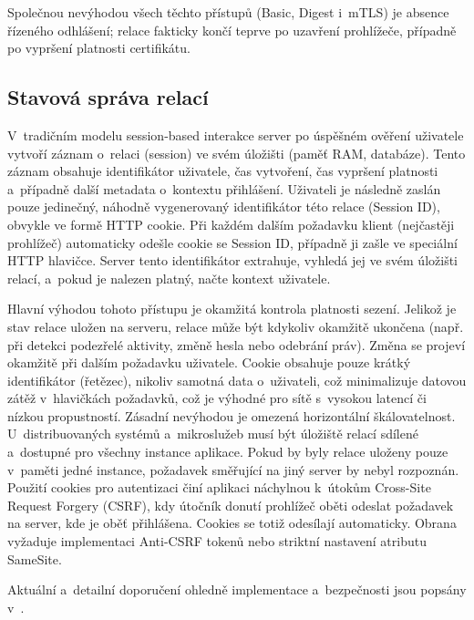 Společnou nevýhodou všech těchto přístupů (Basic, Digest i~mTLS) je absence řízeného odhlášení; relace fakticky končí teprve po uzavření prohlížeče, případně po vypršení platnosti certifikátu.


\subsection{Stavová správa relací}
V~tradičním modelu session-based interakce server po úspěšném ověření uživatele vytvoří záznam o~relaci (session) ve svém úložišti (paměť RAM, databáze).
Tento záznam obsahuje identifikátor uživatele, čas vytvoření, čas vypršení platnosti a~případně další metadata o~kontextu přihlášení.
Uživateli je následně zaslán pouze jedinečný, náhodně vygenerovaný identifikátor této relace (Session ID), obvykle ve formě HTTP cookie.
Při každém dalším požadavku klient (nejčastěji prohlížeč) automaticky odešle cookie se Session ID, případně ji zašle ve speciální HTTP hlavičce.
Server tento identifikátor extrahuje, vyhledá jej ve svém úložišti relací, a~pokud je nalezen platný, načte kontext uživatele.

Hlavní výhodou tohoto přístupu je okamžitá kontrola platnosti sezení.
Jelikož je stav relace uložen na serveru, relace může být kdykoliv okamžitě ukončena (např. při detekci podezřelé aktivity, změně hesla nebo odebrání práv).
Změna se projeví okamžitě při dalším požadavku uživatele.
Cookie obsahuje pouze krátký identifikátor (řetězec), nikoliv samotná data o~uživateli, což minimalizuje datovou zátěž v~hlavičkách požadavků, což je výhodné pro sítě s~vysokou latencí či nízkou propustností.
Zásadní nevýhodou je omezená horizontální škálovatelnost.
U~distribuovaných systémů a~mikroslužeb musí být úložiště relací sdílené a~dostupné pro všechny instance aplikace.
Pokud by byly relace uloženy pouze v~paměti jedné instance, požadavek směřující na jiný server by nebyl rozpoznán.
Použití cookies pro autentizaci činí aplikaci náchylnou k~útokům Cross-Site Request Forgery (CSRF), kdy útočník donutí prohlížeč oběti odeslat požadavek na server, kde je oběť přihlášena.
Cookies se totiž odesílají automaticky.
Obrana vyžaduje implementaci Anti-CSRF tokenů nebo striktní nastavení atributu SameSite.

\vspace{8px}
\noindent Aktuální a~detailní doporučení ohledně implementace a~bezpečnosti jsou popsány v~\cite{www-owasp-session}.

